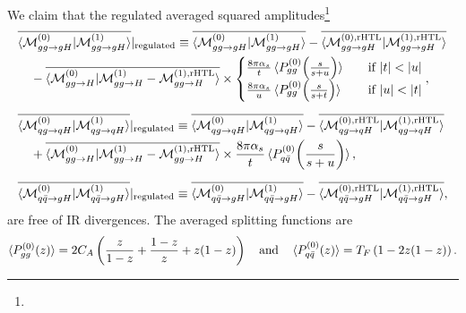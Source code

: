 We claim that the regulated averaged squared amplitudes\footnote{}
\begin{equation}
\begin{split}
&\overline{\braket{\mathcal{M}^{(0)}_{gg\rightarrow gH} | \mathcal{M}^{(1)}_{gg \rightarrow gH}}} \vert_\text{regulated} \equiv  \overline{\braket{\mathcal{M}^{(0)}_{gg\rightarrow gH} | \mathcal{M}^{(1)}_{gg \rightarrow gH}}} -  \overline{\braket{\mathcal{M}^{(0), \text{rHTL}}_{gg\rightarrow gH} | \mathcal{M}^{(1), \text{rHTL}}_{gg \rightarrow gH}}} \\
& \quad - \overline{\braket{\mathcal{M}^{(0)}_{gg \rightarrow H} | \mathcal{M}^{(1)}_{gg \rightarrow H} - \mathcal{M}^{(1), \text{rHTL}}_{gg \rightarrow H}} }  \times \begin{cases} \frac{8 \pi \alpha_s}{t} \braket{P_{gg}^{(0)} \!\left(\frac{s}{s + u} \right)} \quad &\text{if } |t| < |u| \\
\frac{8 \pi \alpha_s}{u} \braket{P_{gg}^{(0)} \!\left(\frac{s}{s + t} \right)} \quad &\text{if } |u| < |t|
\end{cases}, \\[0.2cm]
& \overline{\braket{\mathcal{M}^{(0)}_{qg\rightarrow qH} | \mathcal{M}^{(1)}_{qg \rightarrow qH}}} \vert_\text{regulated} \equiv  \overline{\braket{\mathcal{M}^{(0)}_{qg\rightarrow qH} | \mathcal{M}^{(1)}_{qg \rightarrow qH}}} -  \overline{\braket{\mathcal{M}^{(0), \text{rHTL}}_{qg\rightarrow qH} | \mathcal{M}^{(1), \text{rHTL}}_{qg \rightarrow qH}}} \\
& \quad + \overline{\braket{\mathcal{M}^{(0)}_{gg \rightarrow H} | \mathcal{M}^{(1)}_{gg \rightarrow H} - \mathcal{M}^{(1), \text{rHTL}}_{gg \rightarrow H}}}  \times
\frac{8 \pi \alpha_s}{t} \braket{P_{q\bar{q}}^{(0)} \!\left(\frac{s}{s + u} \right)}, \\[0.2cm]
&\overline{\braket{\mathcal{M}^{(0)}_{q\bar{q}\rightarrow gH} | \mathcal{M}^{(1)}_{q \bar{q} \rightarrow gH}}} \vert_\text{regulated} \equiv  \overline{\braket{\mathcal{M}^{(0)}_{q \bar{q}\rightarrow gH} | \mathcal{M}^{(1)}_{q\bar{q} \rightarrow gH}}} -  \overline{\braket{\mathcal{M}^{(0), \text{rHTL}}_{q \bar{q} \rightarrow gH} | \mathcal{M}^{(1), \text{rHTL}}_{q \bar{q} \rightarrow gH}}}, \\
\end{split}
\label{eq:IR_regulation}
\end{equation}
are free of \acs{IR} divergences. The averaged splitting functions are
\begin{equation}
\braket{P_{gg}^{(0)}(z)} = 2 C_A \left( \frac{z}{1 - z} + \frac{1 - z}{z} + z (1 - z) \right) \quad \text{and} \quad \braket{P_{q \bar{q}}^{(0)}(z)} = T_F \left(1 - 2 z (1 - z) \right).
\end{equation}

